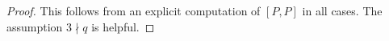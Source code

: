 \begin{proof}
    This follows from an explicit computation of $[P,P]$ in all cases. The assumption $3\nmid q$ is helpful.

\end{proof}
